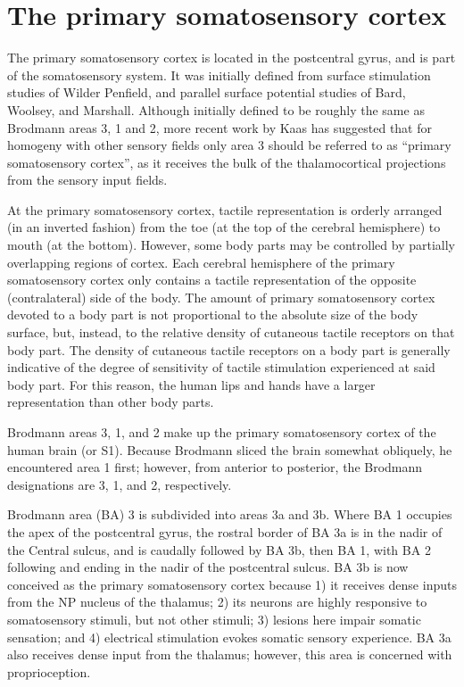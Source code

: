 \hypertarget{the-primary-somatosensory-cortex}{%
\section{The primary somatosensory cortex}\label{the-primary-somatosensory-cortex}}

The primary somatosensory cortex is located in the postcentral gyrus, and is part of the somatosensory system. It was initially defined from surface stimulation studies of Wilder Penfield, and parallel surface potential studies of Bard, Woolsey, and Marshall. Although initially defined to be roughly the same as Brodmann areas 3, 1 and 2, more recent work by Kaas has suggested that for homogeny with other sensory fields only area 3 should be referred to as ``primary somatosensory cortex'', as it receives the bulk of the thalamocortical projections from the sensory input fields.

At the primary somatosensory cortex, tactile representation is orderly arranged (in an inverted fashion) from the toe (at the top of the cerebral hemisphere) to mouth (at the bottom). However, some body parts may be controlled by partially overlapping regions of cortex. Each cerebral hemisphere of the primary somatosensory cortex only contains a tactile representation of the opposite (contralateral) side of the body. The amount of primary somatosensory cortex devoted to a body part is not proportional to the absolute size of the body surface, but, instead, to the relative density of cutaneous tactile receptors on that body part. The density of cutaneous tactile receptors on a body part is generally indicative of the degree of sensitivity of tactile stimulation experienced at said body part. For this reason, the human lips and hands have a larger representation than other body parts.

Brodmann areas 3, 1, and 2 make up the primary somatosensory cortex of the human brain (or S1). Because Brodmann sliced the brain somewhat obliquely, he encountered area 1 first; however, from anterior to posterior, the Brodmann designations are 3, 1, and 2, respectively.

Brodmann area (BA) 3 is subdivided into areas 3a and 3b. Where BA 1 occupies the apex of the postcentral gyrus, the rostral border of BA 3a is in the nadir of the Central sulcus, and is caudally followed by BA 3b, then BA 1, with BA 2 following and ending in the nadir of the postcentral sulcus. BA 3b is now conceived as the primary somatosensory cortex because 1) it receives dense inputs from the NP nucleus of the thalamus; 2) its neurons are highly responsive to somatosensory stimuli, but not other stimuli; 3) lesions here impair somatic sensation; and 4) electrical stimulation evokes somatic sensory experience. BA 3a also receives dense input from the thalamus; however, this area is concerned with proprioception.

